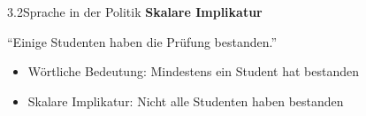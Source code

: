 \documentclass[xcolor=table,9pt,aspectratio=169]{beamer}
\begin{document}
\begin{frame}{\vspace*{10mm}3.2\hspace*{1em}Sprache in der Politik}
\textbf{Skalare Implikatur}

\smallskip
\enquote{Einige Studenten haben die Prüfung bestanden.}
\begin{itemize}
   \item Wörtliche Bedeutung: Mindestens ein Student hat bestanden
   \item Skalare Implikatur: Nicht alle Studenten haben bestanden
\end{itemize}
\end{frame}
\end{document}

